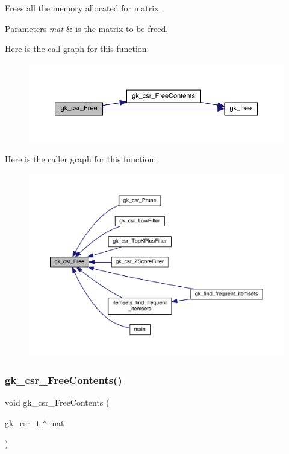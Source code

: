 Frees all the memory allocated for matrix. 
\begin{DoxyParams}{Parameters}
{\em mat} & is the matrix to be freed. \\
\hline
\end{DoxyParams}
Here is the call graph for this function\+:\nopagebreak
\begin{figure}[H]
\begin{center}
\leavevmode
\includegraphics[width=350pt]{a00023_ac3736361b8d6b391356f273c960c203b_cgraph}
\end{center}
\end{figure}
Here is the caller graph for this function\+:\nopagebreak
\begin{figure}[H]
\begin{center}
\leavevmode
\includegraphics[width=350pt]{a00023_ac3736361b8d6b391356f273c960c203b_icgraph}
\end{center}
\end{figure}
\mbox{\label{a00023_a9646f29b0605ba264bf373c441a6826d}} 
\subsubsection{\texorpdfstring{gk\+\_\+csr\+\_\+\+Free\+Contents()}{gk\_csr\_FreeContents()}}
{\footnotesize\ttfamily void gk\+\_\+csr\+\_\+\+Free\+Contents (\begin{DoxyParamCaption}\item[{\hyperlink{a00634}{gk\+\_\+csr\+\_\+t} $\ast$}]{mat }\end{DoxyParamCaption})}

